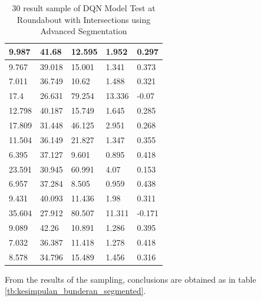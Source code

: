 \documentclass[conference]{IEEEtran}
\begin{document}
\begin{table}[H]
{\begin{tabular}{|l|l|l|l|l|}
				9.987           & 41.68      & 12.595           & 1.952           & 0.297       \\ \hline
				9.767           & 39.018     & 15.001           & 1.341           & 0.373       \\ \hline
				7.011           & 36.749     & 10.62            & 1.488           & 0.321       \\ \hline
				17.4            & 26.631     & 79.254           & 13.336          & -0.07       \\ \hline
				12.798          & 40.187     & 15.749           & 1.645           & 0.285       \\ \hline
				17.809          & 31.448     & 46.125           & 2.951           & 0.268       \\ \hline
				11.504          & 36.149     & 21.827           & 1.347           & 0.355       \\ \hline
				6.395           & 37.127     & 9.601            & 0.895           & 0.418       \\ \hline
				23.591          & 30.945     & 60.991           & 4.07            & 0.153       \\ \hline
				6.957           & 37.284     & 8.505            & 0.959           & 0.438       \\ \hline
				9.431           & 40.093     & 11.436           & 1.98            & 0.311       \\ \hline
				35.604          & 27.912     & 80.507           & 11.311          & -0.171      \\ \hline
				9.089           & 42.26      & 10.891           & 1.286           & 0.395       \\ \hline
				7.032           & 36.387     & 11.418           & 1.278           & 0.418       \\ \hline
				8.578           & 34.796     & 15.489           & 1.456           & 0.316       \\ \hline
			\end{tabular}%
		}
		\caption{30 result sample of DQN Model Test at Roundabout with Intersections using Advanced Segmentation}
		\label{tb:hasilpengujian_bunderan_segmented}
	\end{table}
	
	From the results of the sampling, conclusions are obtained as in table \ref{tb:kesimpulan_bunderan_segmented}.
	
	
	\begin{table}[H]
		\caption{Summary of DQN Model Test at Roundabout with Intersections using Advanced Segmentation}
		\label{tb:kesimpulan_bunderan_segmented}
	\end{table}
	
\end{document}
